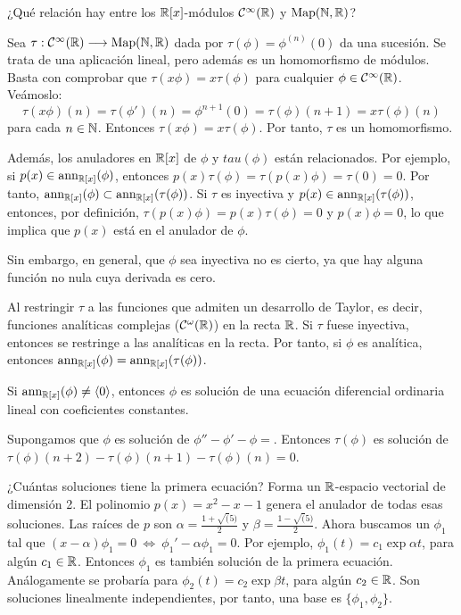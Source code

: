 \begin{ejemplo}
  ¿Qué relación hay entre los \(\mathbb{R}[x]\)-módulos \(\mathcal{C}^\infty(\mathbb{R})\) y \(\operatorname{Map}(\mathbb{N}, \mathbb{R})\)?

  Sea \(\tau : \mathcal{C}^\infty(\mathbb{R}) \longrightarrow \operatorname{Map}(\mathbb{N}, \mathbb{R})\) dada por
  \(\tau(\phi) = \phi^{(n)}(0)\) da una sucesión. Se trata de una aplicación lineal, pero
  además es un homomorfismo de módulos. Basta con comprobar que \(\tau(x\phi) =
  x\tau(\phi)\) para cualquier \(\phi \in \mathcal{C}^\infty(\mathbb{R})\). Veámoslo:
  \[
    \tau(x\phi)(n) = \tau(\phi')(n) = \phi^{n+1}(0) = \tau(\phi)(n+1) = x\tau(\phi)(n)
  \]
  para cada \(n \in \mathbb{N}\). Entonces \(\tau(x\phi) = x\tau(\phi)\). Por tanto,
  \(\tau\) es un homomorfismo.

  Además, los anuladores en \(\mathbb{R}[x]\) de \(\phi\) y \(tau(\phi)\) están relacionados.
  Por ejemplo, si \(p(x) \in \operatorname{ann}_{\mathbb{R}[x]}(\phi)\), entonces \(p(x)\tau(\phi) =
  \tau(p(x)\phi) = \tau(0) = 0\). Por tanto, \(\operatorname{ann}_{\mathbb{R}[x]}(\phi) \subset
  \operatorname{ann}_{\mathbb{R}[x]}(\tau(\phi))\). Si \(\tau\) es inyectiva y \(p(x) \in
  \operatorname{ann}_{\mathbb{R}[x]}(\tau(\phi))\), entonces, por definición,
  \(\tau(p(x)\phi) = p(x)\tau(\phi) = 0\) y \(p(x)\phi = 0\), lo que implica que
  \(p(x)\) está en el anulador de \(\phi\).

  Sin embargo, en general, que \(\phi\) sea inyectiva no es cierto, ya que hay alguna
  función no nula cuya derivada es cero.

  Al restringir \(\tau\) a las funciones que admiten un desarrollo de Taylor, es decir,
  funciones analíticas complejas (\(\mathcal{C}^{\omega}(\mathbb{R})\)) en la recta \(\mathbb{R}\). Si
  \(\tau\) fuese inyectiva, entonces se restringe a las analíticas en la recta. Por
  tanto, si \(\phi\) es analítica, entonces \(\operatorname{ann}_{\mathbb{R}[x]}(\phi) = \operatorname{ann}_{\mathbb{R}[x]}(\tau(\phi))
  \).

  Si \(\operatorname{ann}_{\mathbb{R}[x]}(\phi) \neq \langle 0 \rangle\), entonces \(\phi\) es solución de una
  ecuación diferencial ordinaria lineal con coeficientes constantes.

  Supongamos que \(\phi\) es solución de \(\phi'' - \phi' - \phi = \). Entonces
  \(\tau(\phi)\) es solución de \(\tau(\phi)(n+2) - \tau(\phi)(n+1) - \tau(\phi)(n) = 0\).

  ¿Cuántas soluciones tiene la primera ecuación? Forma un \(\mathbb{R}\)-espacio vectorial de
  dimensión 2. El polinomio \(p(x) = x^2 - x - 1\) genera el anulador de todas esas
  soluciones. Las raíces de \(p\) son \(\alpha = \frac{1 + \sqrt(5)}{2}\) y
  \(\beta = \frac{1 - \sqrt(5)}{2}\). Ahora buscamos un \(\phi_1\) tal que
  \((x-\alpha)\phi_1 = 0 \ \iff \ \phi_1' - \alpha\phi_1 = 0\). Por ejemplo,
  \(\phi_1(t) = c_1\exp{\alpha t}\), para algún \(c_1 \in \mathbb{R}\). Entonces \(\phi_1\)
  es también solución de la primera ecuación. Análogamente se probaría para
  \(\phi_2(t) = c_2\exp{\beta t}\), para algún \(c_2 \in \mathbb{R}\). Son soluciones
  linealmente independientes, por tanto, una base es \(\{\phi_1, \phi_2\}\).


\end{ejemplo}

